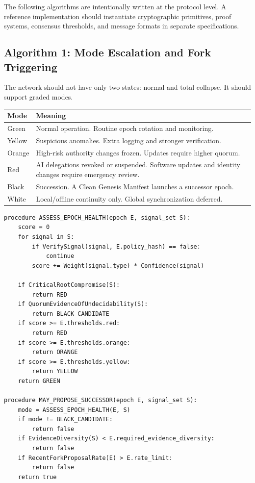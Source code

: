 \documentclass[11pt,letterpaper]{article}
\begin{document}
The following algorithms are intentionally written at the protocol level. A reference implementation should instantiate cryptographic primitives, proof systems, consensus thresholds, and message formats in separate specifications.

\subsection{Algorithm 1: Mode Escalation and Fork Triggering}

The network should not have only two states: normal and total collapse. It should support graded modes.

\begin{longtable}{p{}p{}}
\toprule
\textbf{Mode} & \textbf{Meaning} \\
\midrule
Green & Normal operation. Routine epoch rotation and monitoring. \\
Yellow & Suspicious anomalies. Extra logging and stronger verification. \\
Orange & High-risk authority changes frozen. Updates require higher quorum. \\
Red & AI delegations revoked or suspended. Software updates and identity changes require emergency review. \\
Black & Succession. A Clean Genesis Manifest launches a successor epoch. \\
White & Local/offline continuity only. Global synchronization deferred. \\
\bottomrule
\end{longtable}

\begin{lstlisting}[caption={Mode escalation and fork trigger}]
procedure ASSESS_EPOCH_HEALTH(epoch E, signal_set S):
    score = 0
    for signal in S:
        if VerifySignal(signal, E.policy_hash) == false:
            continue
        score += Weight(signal.type) * Confidence(signal)

    if CriticalRootCompromise(S):
        return RED
    if QuorumEvidenceOfUndecidability(S):
        return BLACK_CANDIDATE
    if score >= E.thresholds.red:
        return RED
    if score >= E.thresholds.orange:
        return ORANGE
    if score >= E.thresholds.yellow:
        return YELLOW
    return GREEN

procedure MAY_PROPOSE_SUCCESSOR(epoch E, signal_set S):
    mode = ASSESS_EPOCH_HEALTH(E, S)
    if mode != BLACK_CANDIDATE:
        return false
    if EvidenceDiversity(S) < E.required_evidence_diversity:
        return false
    if RecentForkProposalRate(E) > E.rate_limit:
        return false
    return true
\end{lstlisting}
\end{document}

